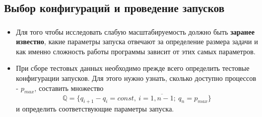 \documentclass[unicode, t, 11pt]{beamer}%
\begin{document}
		\subsection{Выбор конфигураций и проведение запусков}
			\begin{frame}
				\frametitle{\insertsection}
	 			\framesubtitle{\insertsubsection}
	 			\begin{itemize}[label=\(\bullet\)]
					\item Для того чтобы исследовать слабую масштабируемость должно быть \textbf{заранее известно}, какие параметры запуска отвечают за определение размера задачи и как именно сложность работы программы зависит от этих самых параметров.
					\item При сборе тестовых данных необходимо прежде всего определить тестовые конфигурации запусков. Для этого нужно узнать, сколько доступно процессов - \(p_{max}\), составить множество \[\mathbb{Q} = \{q_{i + 1} - q_{i} = const,\ i = \overline{1,n - 1};\ q_n = p_{max}\}\] и определить соответствующие параметры запуска.
				\end{itemize}
			\end{frame}
\end{document}
